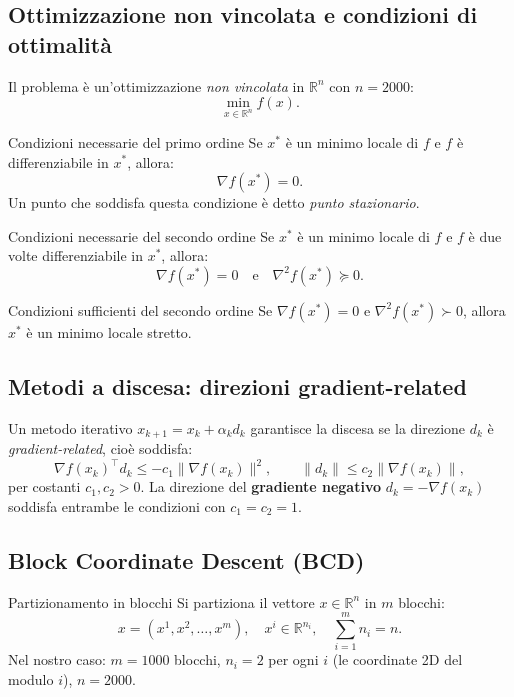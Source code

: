 \documentclass[12pt,a4paper]{article}
\theoremstyle{definition}
\newcommand{\R}{\mathbb{R}}
\newcommand{\grad}{\nabla}
\newcommand{\Hess}{\nabla^2}
\newcommand{\T}{^{\top}}
\begin{document}
\subsection{Ottimizzazione non vincolata e condizioni di ottimalità}

Il problema è un'ottimizzazione \emph{non vincolata} in $\R^{n}$ con $n = 2000$:
\[
  \min_{x \in \R^n} f(x).
\]

\begin{thmbox}{Condizioni necessarie del primo ordine}
Se $x^*$ è un minimo locale di $f$ e $f$ è differenziabile in $x^*$, allora:
\[
  \grad f(x^*) = 0.
\]
Un punto che soddisfa questa condizione è detto \emph{punto stazionario}.
\end{thmbox}

\begin{thmbox}{Condizioni necessarie del secondo ordine}
Se $x^*$ è un minimo locale di $f$ e $f$ è due volte differenziabile in $x^*$, allora:
\[
  \grad f(x^*) = 0 \quad \text{e} \quad \Hess f(x^*) \succeq 0.
\]
\end{thmbox}

\begin{thmbox}{Condizioni sufficienti del secondo ordine}
Se $\grad f(x^*) = 0$ e $\Hess f(x^*) \succ 0$, allora $x^*$ è un minimo locale stretto.
\end{thmbox}

\subsection{Metodi a discesa: direzioni gradient-related}

Un metodo iterativo $x_{k+1} = x_k + \alpha_k d_k$ garantisce la discesa se la direzione
$d_k$ è \emph{gradient-related}, cioè soddisfa:
\[
  \grad f(x_k)\T d_k \leq -c_1 \|\grad f(x_k)\|^2, \qquad
  \|d_k\| \leq c_2 \|\grad f(x_k)\|,
\]
per costanti $c_1, c_2 > 0$.
La direzione del \textbf{gradiente negativo} $d_k = -\grad f(x_k)$ soddisfa entrambe
le condizioni con $c_1 = c_2 = 1$.

\subsection{Block Coordinate Descent (BCD)}

\begin{definbox}{Partizionamento in blocchi}
Si partiziona il vettore $x \in \R^n$ in $m$ blocchi:
\[
  x = (x^1, x^2, \ldots, x^m), \quad x^i \in \R^{n_i}, \quad \sum_{i=1}^m n_i = n.
\]
Nel nostro caso: $m = 1000$ blocchi, $n_i = 2$ per ogni $i$ (le coordinate 2D del modulo $i$),
$n = 2000$.
\end{definbox}
\end{document}
